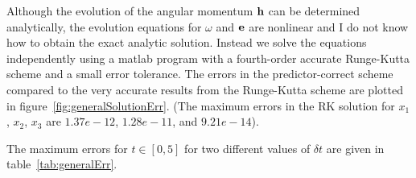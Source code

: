 Although the evolution of the angular momentum $\mathbf{ h}$ can be determined analytically,
the evolution equations for $\omega$ and $\mathbf{ e}$ are nonlinear and I do not know how
to obtain the exact analytic solution. Instead we solve the equations independently 
using a matlab program with a fourth-order accurate Runge-Kutta scheme and a small
error tolerance. The errors in the predictor-correct scheme compared to
the very accurate results from the Runge-Kutta scheme are plotted in figure~\ref{fig:generalSolutionErr}.
(The maximum errors in the RK solution for $x_1$, $x_2$, $x_3$ are 
$1.37e-12$, $1.28e-11$, and $9.21e-14$). 



The maximum errors for $t\in[0,5]$ for two different values of $\delta t$ are given in table~\ref{tab:generalErr}.

